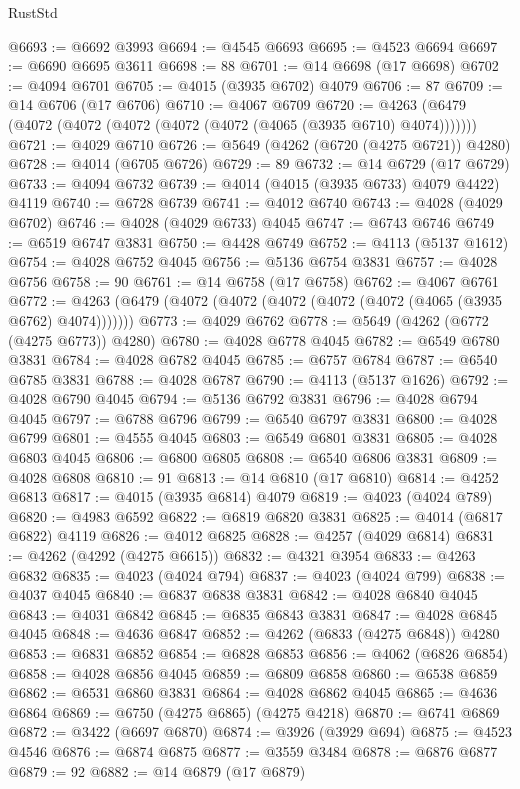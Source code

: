 \begin{lexlean}{RustStd}
\begin{coremodule}
@6693 := @6692 @3993
@6694 := @4545 @6693
@6695 := @4523 @6694
@6697 := @6690 @6695 @3611
@6698 := 88
@6701 := @14 @6698 (@17 @6698)
@6702 := @4094 @6701
@6705 := @4015 (@3935 @6702) @4079
@6706 := 87
@6709 := @14 @6706 (@17 @6706)
@6710 := @4067 @6709
@6720 := @4263 (@6479 (@4072 (@4072 (@4072 (@4072 (@4072 (@4065 (@3935 @6710) @4074)))))))
@6721 := @4029 @6710
@6726 := @5649 (@4262 (@6720 (@4275 @6721)) @4280)
@6728 := @4014 (@6705 @6726)
@6729 := 89
@6732 := @14 @6729 (@17 @6729)
@6733 := @4094 @6732
@6739 := @4014 (@4015 (@3935 @6733) @4079 @4422) @4119
@6740 := @6728 @6739
@6741 := @4012 @6740
@6743 := @4028 (@4029 @6702)
@6746 := @4028 (@4029 @6733) @4045
@6747 := @6743 @6746
@6749 := @6519 @6747 @3831
@6750 := @4428 @6749
@6752 := @4113 (@5137 @1612)
@6754 := @4028 @6752 @4045
@6756 := @5136 @6754 @3831
@6757 := @4028 @6756
@6758 := 90
@6761 := @14 @6758 (@17 @6758)
@6762 := @4067 @6761
@6772 := @4263 (@6479 (@4072 (@4072 (@4072 (@4072 (@4072 (@4065 (@3935 @6762) @4074)))))))
@6773 := @4029 @6762
@6778 := @5649 (@4262 (@6772 (@4275 @6773)) @4280)
@6780 := @4028 @6778 @4045
@6782 := @6549 @6780 @3831
@6784 := @4028 @6782 @4045
@6785 := @6757 @6784
@6787 := @6540 @6785 @3831
@6788 := @4028 @6787
@6790 := @4113 (@5137 @1626)
@6792 := @4028 @6790 @4045
@6794 := @5136 @6792 @3831
@6796 := @4028 @6794 @4045
@6797 := @6788 @6796
@6799 := @6540 @6797 @3831
@6800 := @4028 @6799
@6801 := @4555 @4045
@6803 := @6549 @6801 @3831
@6805 := @4028 @6803 @4045
@6806 := @6800 @6805
@6808 := @6540 @6806 @3831
@6809 := @4028 @6808
@6810 := 91
@6813 := @14 @6810 (@17 @6810)
@6814 := @4252 @6813
@6817 := @4015 (@3935 @6814) @4079
@6819 := @4023 (@4024 @789)
@6820 := @4983 @6592
@6822 := @6819 @6820 @3831
@6825 := @4014 (@6817 @6822) @4119
@6826 := @4012 @6825
@6828 := @4257 (@4029 @6814)
@6831 := @4262 (@4292 (@4275 @6615))
@6832 := @4321 @3954
@6833 := @4263 @6832
@6835 := @4023 (@4024 @794)
@6837 := @4023 (@4024 @799)
@6838 := @4037 @4045
@6840 := @6837 @6838 @3831
@6842 := @4028 @6840 @4045
@6843 := @4031 @6842
@6845 := @6835 @6843 @3831
@6847 := @4028 @6845 @4045
@6848 := @4636 @6847
@6852 := @4262 (@6833 (@4275 @6848)) @4280
@6853 := @6831 @6852
@6854 := @6828 @6853
@6856 := @4062 (@6826 @6854)
@6858 := @4028 @6856 @4045
@6859 := @6809 @6858
@6860 := @6538 @6859
@6862 := @6531 @6860 @3831
@6864 := @4028 @6862 @4045
@6865 := @4636 @6864
@6869 := @6750 (@4275 @6865) (@4275 @4218)
@6870 := @6741 @6869
@6872 := @3422 (@6697 @6870)
@6874 := @3926 (@3929 @694)
@6875 := @4523 @4546
@6876 := @6874 @6875
@6877 := @3559 @3484
@6878 := @6876 @6877
@6879 := 92
@6882 := @14 @6879 (@17 @6879)

\end{coremodule}
\end{lexlean}

